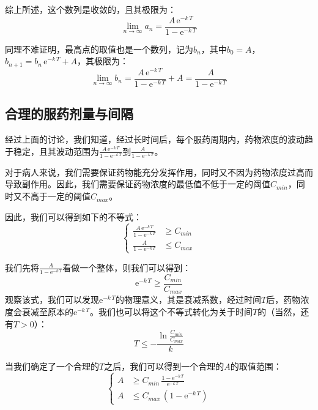 \documentclass[12pt,AutoFakeSlant,AutoFakeBold]{article}
\begin{document}
综上所述，这个数列是收敛的，且其极限为：
\begin{equation}
    \lim_{n\to\infty} a_n = \frac{A\,\mathrm{e}^{-k\,T}}{1 - \mathrm{e}^{-k\,T}}
\end{equation}

同理不难证明，最高点的取值也是一个数列，记为$b_n$，其中$b_0 = A$，$b_{n+1} = b_n\,\mathrm{e}^{-k\,T} + A$，其极限为：
\begin{equation}
    \lim_{n\to\infty} b_n = \frac{A\,\mathrm{e}^{-k\,T}}{1 - \mathrm{e}^{-k\,T}} + A = \frac{A}{1 - \mathrm{e}^{-k\,T}}
\end{equation}

\subsection{合理的服药剂量与间隔}

经过上面的讨论，我们知道，经过长时间后，每个服药周期内，药物浓度的波动趋于稳定，且其波动范围为$\frac{A\,\mathrm{e}^{-k\,T}}{1 - \mathrm{e}^{-k\,T}}$到$\frac{A}{1 - \mathrm{e}^{-k\,T}}$。

对于病人来说，我们需要保证药物能充分发挥作用，同时又不因为药物浓度过高而导致副作用。因此，我们需要保证药物浓度的最低值不低于一定的阈值$C_{min}$，同时又不高于一定的阈值$C_{max}$。

因此，我们可以得到如下的不等式：
\begin{equation}
    \left\{
        \begin{aligned}
            \frac{A\,\mathrm{e}^{-k\,T}}{1 - \mathrm{e}^{-k\,T}} &\geq C_{min}\\
            \frac{A}{1 - \mathrm{e}^{-k\,T}} &\leq C_{max}
        \end{aligned}
    \right.
\end{equation}

我们先将$\frac{A}{1-\mathrm{e}^{-k\,T}}$看做一个整体，则我们可以得到：
\begin{equation}
    \mathrm{e}^{-k\,T} \geq \frac{C_{min}}{C_{max}}
\end{equation}
观察该式，我们可以发现$\mathrm{e}^{-k\,T}$的物理意义，其是衰减系数，经过时间$T$后，药物浓度会衰减至原本的$\mathrm{e}^{-k\,T}$。我们也可以将这个不等式转化为关于时间$T$的（当然，还有$T > 0$）：
\begin{equation}
    T \leq -\frac{\ln\frac{C_{min}}{C_{max}}}{k}
\end{equation}

当我们确定了一个合理的$T$之后，我们可以得到一个合理的$A$的取值范围：
\begin{equation}
    \left\{
        \begin{aligned}
            A &\geq C_{min}\,\frac{1 - \mathrm{e}^{-k\,T}}{\mathrm{e}^{-k\,T}}\\
            A &\leq C_{max}\,(1 - \mathrm{e}^{-k\,T})
        \end{aligned}
    \right.
\end{equation}
\end{document}
